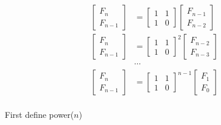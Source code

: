                    \begin{align*}
                        \begin{bmatrix}
                            F_n \\ F_{n - 1}
                        \end{bmatrix} &= \begin{bmatrix}
                            1 & 1 \\ 1 & 0
                        \end{bmatrix} \begin{bmatrix}
                            F_{n - 1} \\ F_{n - 2}
                        \end{bmatrix}\\
                        \begin{bmatrix}
                            F_n \\ F_{n - 1}
                        \end{bmatrix} &= \begin{bmatrix}
                            1 & 1 \\ 1 & 0
                        \end{bmatrix}^2 \begin{bmatrix}
                            F_{n - 2} \\ F_{n - 3}
                        \end{bmatrix}\\
                        &\cdots\\
                        \begin{bmatrix}
                            F_n \\ F_{n - 1}
                        \end{bmatrix} &= \begin{bmatrix}
                            1 & 1 \\ 1 & 0
                        \end{bmatrix}^{n - 1} \begin{bmatrix}
                            F_1 \\ F_0
                        \end{bmatrix}\\
                    \end{align*}

                    First define power($n$)

